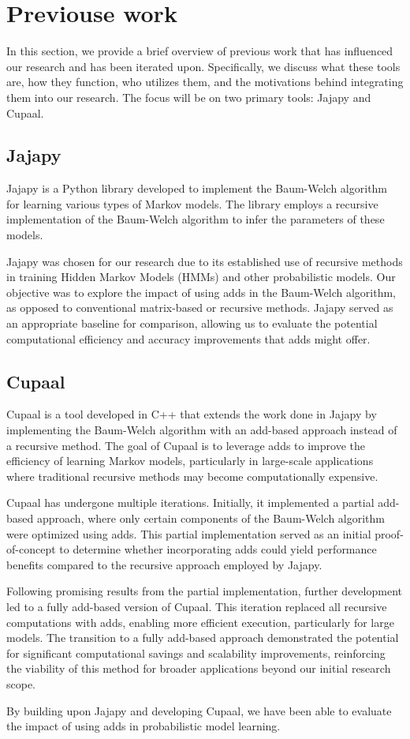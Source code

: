 \section{Previouse work}\label{sec:jajapy_and_cupaal}
In this section, we provide a brief overview of previous work that has influenced our research and has been iterated upon.
Specifically, we discuss what these tools are, how they function, who utilizes them, and the motivations behind integrating them into our research.
The focus will be on two primary tools: Jajapy and Cupaal.


\subsection{Jajapy}\label{subsec:jajapy}
Jajapy is a Python library developed to implement the Baum-Welch algorithm for learning various types of Markov models.
The library employs a recursive implementation of the Baum-Welch algorithm to infer the parameters of these models.

Jajapy was chosen for our research due to its established use of recursive methods in training Hidden Markov Models (HMMs) and other probabilistic models.
Our objective was to explore the impact of using \glspl{add} in the Baum-Welch algorithm, as opposed to conventional matrix-based or recursive methods.
Jajapy served as an appropriate baseline for comparison, allowing us to evaluate the potential computational efficiency and accuracy improvements that \glspl{add} might offer.


\subsection{Cupaal}\label{subsec:cupaal}
Cupaal is a tool developed in C++ that extends the work done in Jajapy by implementing the Baum-Welch algorithm with an \gls{add}-based approach instead of a recursive method.
The goal of Cupaal is to leverage \glspl{add} to improve the efficiency of learning Markov models, particularly in large-scale applications where traditional recursive methods may become computationally expensive.

Cupaal has undergone multiple iterations. Initially, it implemented a partial \gls{add}-based approach, where only certain components of the Baum-Welch algorithm were optimized using \glspl{add}.
This partial implementation served as an initial proof-of-concept to determine whether incorporating \glspl{add} could yield performance benefits compared to the recursive approach employed by Jajapy.

Following promising results from the partial implementation, further development led to a fully \gls{add}-based version of Cupaal.
This iteration replaced all recursive computations with \glspl{add}, enabling more efficient execution, particularly for large models.
The transition to a fully \gls{add}-based approach demonstrated the potential for significant computational savings and scalability improvements, reinforcing the viability of this method for broader applications beyond our initial research scope.

By building upon Jajapy and developing Cupaal, we have been able to evaluate the impact of using \glspl{add} in probabilistic model learning.
